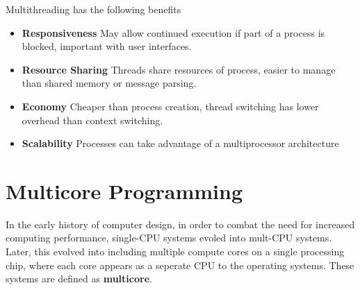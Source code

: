 \documentclass[oneside]{book}
\begin{document}
            Multithreading has the following benefits
            \begin{itemize}
                \item \textbf{Responsiveness}
                    \subitem May allow continued execution if part of a process is blocked, important with user interfaces.
                \item \textbf{Resource Sharing}
                    \subitem Threads share resources of process, easier to manage than shared memory or message parsing.
                \item \textbf{Economy}
                    \subitem Cheaper than process creation, thread switching has lower overhead than context switching.
                \item \textbf{Scalability}
                    \subitem Processes can take advantage of a multiprocessor architecture
            \end{itemize}
        \section{Multicore Programming}
            In the early history of computer design, in order to combat the need for increased computing performance, single-CPU systems
            evoled into mult-CPU systems. Later, this evolved into including multiple compute cores on a single processing chip, where each core
            appears as a seperate CPU to the operating systems. These systems are defined as \textbf{multicore}.
\end{document}
